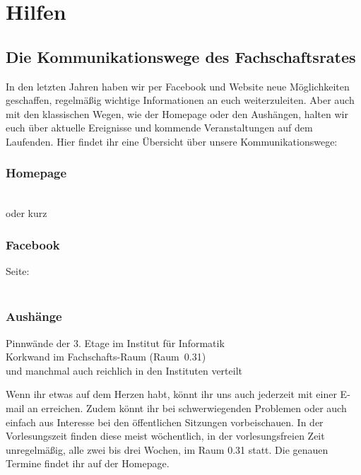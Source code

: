 \section{Hilfen}

\subsection[Kommunikationswege des FSR]{Die Kommunikationswege des Fachschaftsrates}

In den letzten Jahren haben wir per Facebook und Website neue Mög\-lich\-kei\-ten geschaffen, regelmäßig wichtige Informationen an euch
weiterzuleiten.
Aber auch mit den klassischen Wegen, wie der Homepage oder den Aushängen, halten wir euch über aktuelle Ereignisse und kommende Veranstaltungen
auf dem Laufenden.
Hier findet ihr eine Übersicht über unsere Kommunikationswege:

\subsubsection{Homepage}

 \\
oder kurz 

\subsubsection{Facebook}

%	
Seite:  \\
 \\

\subsubsection{Aushänge}

Pinnwände der 3. Etage im Institut für Informatik \\
Korkwand im Fachschafts-Raum (Raum~0.31) \\
und manchmal auch reichlich in den Instituten verteilt

Wenn ihr etwas auf dem Herzen habt, könnt ihr uns auch jederzeit mit einer E-mail an  erreichen.
Zudem könnt ihr bei schwerwiegenden Problemen oder auch einfach aus Interesse bei den öffentlichen Sitzungen vorbeischauen.
In der Vorlesungszeit finden diese meist wöchentlich, in der vorlesungsfreien Zeit unregelmäßig, alle zwei bis drei Wochen, im Raum 0.31 statt.
Die genauen Termine findet ihr auf der Homepage.

